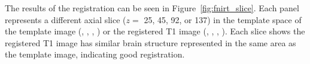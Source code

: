 \documentclass[a4paper]{report}\usepackage[]{graphicx}\usepackage[]{color}
\makeatletter
\newcommand\gobblepars{%
    \@ifnextchar\par%
        {\expandafter\gobblepars\@gobble}%
        {}}
\makeatother
\begin{document}
\begin{article}
\gobblepars

 
The results of the registration can be seen in Figure~\ref{fig:fnirt_slice}.  Each panel represents a different axial slice ($z =$ 25, 45, 92, or 137) in the template space of the template image (\protect{}, \protect{}, \protect{}, \protect{}) or the registered T1 image (\protect{}, \protect{}, \protect{}, \protect{}).  Each slice shows the registered T1 image has similar brain structure represented in the same area as the template image, indicating good registration.





\end{article}
\end{document}

